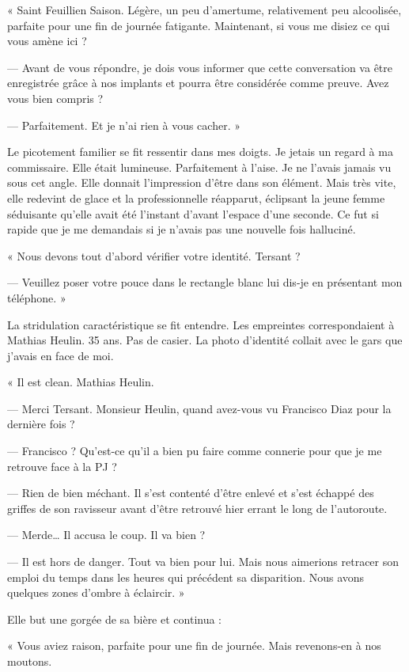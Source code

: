 « Saint Feuillien Saison. Légère, un peu d'amertume, relativement peu alcoolisée, parfaite pour une fin de journée 
fatigante. Maintenant, si vous me disiez ce qui vous amène ici ?

— Avant de vous répondre, je dois vous informer que cette conversation va être enregistrée grâce à nos implants et 
pourra être considérée comme preuve. Avez vous bien compris ?

— Parfaitement. Et je n'ai rien à vous cacher. »

Le picotement familier se fit ressentir dans mes doigts. Je jetais un regard à ma commissaire. Elle était lumineuse. 
Parfaitement à l'aise. Je ne l'avais jamais vu sous cet angle. Elle donnait l'impression d'être dans son élément. Mais 
très vite, elle redevint de glace et la professionnelle réapparut, éclipsant la jeune femme séduisante qu'elle 
avait été l'instant d'avant l'espace d'une seconde. Ce fut si rapide que je me demandais si je n'avais pas une nouvelle 
fois halluciné.

« Nous devons tout d'abord vérifier votre identité. Tersant ?

— Veuillez poser votre pouce dans le rectangle blanc lui dis-je en présentant mon téléphone. »

La stridulation caractéristique se fit entendre. Les empreintes correspondaient à Mathias Heulin. 35 ans. Pas de 
casier. La photo d'identité collait avec le gars que j'avais en face de moi. 

« Il est clean. Mathias Heulin.

— Merci Tersant. Monsieur Heulin, quand avez-vous vu Francisco Diaz pour la dernière fois ?

— Francisco ? Qu'est-ce qu'il a bien pu faire comme connerie pour que je me retrouve face à la PJ ?

— Rien de bien méchant. Il s'est contenté d'être enlevé et s'est échappé des griffes de son ravisseur avant d'être 
retrouvé hier errant le long de l'autoroute.

— Merde… Il accusa le coup. Il va bien ?

— Il est hors de danger. Tout va bien pour lui. Mais nous aimerions retracer son emploi du temps dans les heures 
qui précédent sa disparition. Nous avons quelques zones d'ombre à éclaircir. »

Elle but une gorgée de sa bière et continua :

« Vous aviez raison, parfaite pour une fin de journée. Mais revenons-en à nos moutons.

